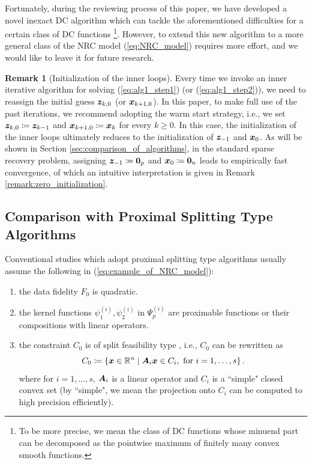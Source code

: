 \documentclass[lettersize,journal]{IEEEtran}
\theoremstyle{plain}%
\theoremstyle{definition}
\newtheorem{remark}{Remark}
\theoremstyle{remark}
\begin{document}
Fortunately, during the reviewing process of this paper, we have developed a novel inexact DC algorithm \cite{zhang2023} which can tackle the aforementioned difficulties for a certain class of DC functions \footnote{To be more precise, we mean the class of DC functions whose minuend part can be decomposed as the pointwise maximum of finitely many convex smooth functions.}. However, to extend this new algorithm to a more general class of the NRC model (\ref{eq:NRC_model}) requires more effort, and we would like to leave it for future research.

\begin{remark}[Initialization of the inner loops]
Every time we invoke an inner iterative algorithm for solving (\ref{eq:alg1_step1}) (or (\ref{eq:alg1_step2})), we need to reassign the initial guess $\bm{z}_{k,0}$ (or $\bm{x}_{k+1,0}$). In this paper, to make full use of the past iterations, we recommend adopting the warm start strategy, i.e., we set $\bm{z}_{k,0} \coloneqq \bm{z}_{k-1}$ and $\bm{x}_{k+1,0}\coloneqq \bm{x}_{k}$ for every $k\geq 0$. In this case, the initialization of the inner loops ultimately reduces to the initialization of $\bm{z}_{-1}$ and $\bm{x}_0$. As will be shown in Section \ref{sec:comparison_of_algorithms}, in the standard sparse recovery problem, assigning $\bm{z}_{-1}\coloneqq \mathbf{0}_p$ and $\bm{x}_{0}\coloneqq \mathbf{0}_n$ leads to empirically fast convergence, of which an intuitive interpretation is given in Remark \ref{remark:zero_initialization}. 
\end{remark}



\subsection{Comparison with Proximal Splitting Type Algorithms}\label{sec:comparison_with_proximal_methods}
Conventional studies \cite{selesnick2017,abe2020,alshabili2021,yata2021} which adopt proximal splitting type algorithms usually assume the following in (\ref{eq:example_of_NRC_model}):
\begin{enumerate}
\item the data fidelity $F_0$ is quadratic.
\item the kernel functions $\psi_{1}^{(i)},\psi_{2}^{(i)}$ in $\Psi_{p}^{(i)}$ are proximable functions or their compositions with linear operators.
\item the constraint $C_0$ is of split feasibility type \cite{censor2005}, i.e., $C_0$ can be rewritten as
\begin{equation*}
C_0\coloneqq \left\{ \bm{x}\in\mathbb{R}^n\mid \bm{A}_i\bm{x}\in C_i, \textrm{ for } i=1,\dots, s \right\}.
\end{equation*}
where for $i=1,\dots,s$, $\bm{A}_i$ is a linear operator and $C_i$ is a ``simple" closed convex set (by ``simple", we mean the projection onto $C_i$ can be computed to high precision efficiently).
\end{enumerate}
\end{document}
